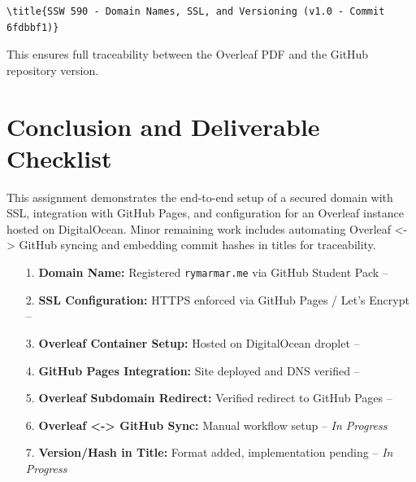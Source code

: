 \begin{verbatim}
\title{SSW 590 - Domain Names, SSL, and Versioning (v1.0 - Commit 6fdbbf1)}
\end{verbatim}

This ensures full traceability between the Overleaf PDF and the GitHub repository version.

\section{Conclusion and Deliverable Checklist}
This assignment demonstrates the end-to-end setup of a secured domain with SSL, integration with GitHub Pages, and configuration for an Overleaf instance hosted on DigitalOcean.  
Minor remaining work includes automating Overleaf <-> GitHub syncing and embedding commit hashes in titles for traceability.

\begin{itemize}
    \item[1.] \textbf{Domain Name:} Registered \texttt{rymarmar.me} via GitHub Student Pack – \checkmark
    \item[2.] \textbf{SSL Configuration:} HTTPS enforced via GitHub Pages / Let’s Encrypt – \checkmark
    \item[3.] \textbf{Overleaf Container Setup:} Hosted on DigitalOcean droplet – \checkmark
    \item[4.] \textbf{GitHub Pages Integration:} Site deployed and DNS verified – \checkmark
    \item[5.] \textbf{Overleaf Subdomain Redirect:} Verified redirect to GitHub Pages – \checkmark
    \item[6.] \textbf{Overleaf <-> GitHub Sync:} Manual workflow setup – \textit{In Progress}
    \item[7.] \textbf{Version/Hash in Title:} Format added, implementation pending – \textit{In Progress}
\end{itemize}

